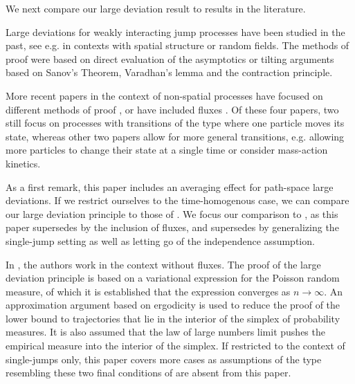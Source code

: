 \documentclass[a4paper]{article}
\numberwithin{equation}{section}
\theoremstyle{definition}
\begin{document}
\smallskip

We next compare our large deviation result to results in the literature. 

Large deviations for weakly interacting jump processes have been studied in the past, see e.g. \cite{Com87,Le95,DPdH96} in contexts with spatial structure or random fields. The methods of proof were based on direct evaluation of the asymptotics or tilting arguments based on Sanov's Theorem, Varadhan's lemma and the contraction principle.

\smallskip


More recent papers in the context of non-spatial processes have focused on different methods of proof \cite{Kr16b,DuRaWu16}, or have included fluxes \cite{Re18,PaRe19}. Of these four papers, two \cite{Kr16b,Re18} still focus on processes with transitions of the type where one particle moves its state, whereas other two papers \cite{DuRaWu16,PaRe19} allow for more general transitions, e.g. allowing more particles to change their state at a single time or consider mass-action kinetics.  

As a first remark, this paper includes an averaging effect for path-space large deviations. If we restrict ourselves to the time-homogenous case, we can compare our large deviation principle to those of \cite{Kr16b,Re18,DuRaWu16,PaRe19}. We focus our comparison to \cite{DuRaWu16,PaRe19}, as this paper supersedes \cite{Kr16b} by the inclusion of fluxes, and \cite{PaRe19} supersedes \cite{Re18} by generalizing the single-jump setting as well as letting go of the independence assumption.

In \cite{DuRaWu16}, the authors work in the context without fluxes. The proof of the large deviation principle is based on a variational expression for the Poisson random measure, of which it is established that the expression converges as $n \rightarrow \infty$. An approximation argument based on ergodicity is used to reduce the proof of the lower bound to trajectories that lie in the interior of the simplex of probability measures. It is also assumed that the law of large numbers limit pushes the empirical measure into the interior of the simplex. If restricted to the context of single-jumps only, this paper covers more cases as assumptions of the type resembling these two final conditions of \cite{DuRaWu16} are absent from this paper.
\end{document}
